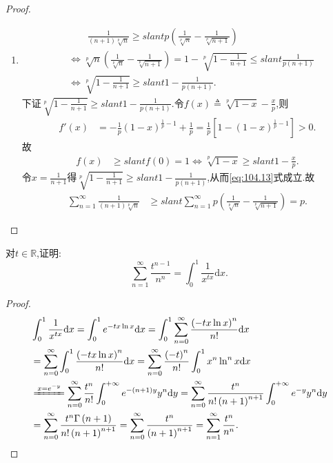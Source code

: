 \documentclass[../../main.tex]{subfiles}
\begin{document}
\begin{proof}
\begin{enumerate}
\item \begin{align}
&\quad \quad \frac{1}{\left( n+1 \right) \sqrt[p]{n}}\geqslant slant p\left( \frac{1}{\sqrt[p]{n}}-\frac{1}{\sqrt[p]{n+1}} \right) \label{eq:104.13} \\
&\Longleftrightarrow \sqrt[p]{n}\left( \frac{1}{\sqrt[p]{n}}-\frac{1}{\sqrt[p]{n+1}} \right) =1-\sqrt[p]{1-\frac{1}{n+1}}\leqslant slant \frac{1}{p\left( n+1 \right)}\nonumber \\
&\Longleftrightarrow \sqrt[p]{1-\frac{1}{n+1}}\geqslant slant 1-\frac{1}{p\left( n+1 \right)}.\nonumber
\end{align}
下证$\sqrt[p]{1-\frac{1}{n+1}}\geqslant slant 1-\frac{1}{p\left( n+1 \right)}$.令$f\left( x \right) \triangleq \sqrt[p]{1-x}-\frac{x}{p}$,则
\begin{align*}
f\prime \left( x \right) &=-\frac{1}{p}\left( 1-x \right) ^{\frac{1}{p}-1}+\frac{1}{p}=\frac{1}{p}\left[ 1-\left( 1-x \right) ^{\frac{1}{p}-1} \right] >0.
\end{align*}
故
\begin{align*}
f\left( x \right) &\geqslant slant f\left( 0 \right) =1\Longleftrightarrow \sqrt[p]{1-x}\geqslant slant 1-\frac{x}{p}.
\end{align*}
令$x=\frac{1}{n+1}$得$\sqrt[p]{1-\frac{1}{n+1}}\geqslant slant 1-\frac{1}{p\left( n+1 \right)}$,从而\eqref{eq:104.13}式成立.故
\begin{align*}
\sum_{n=1}^{\infty}{\frac{1}{\left( n+1 \right) \sqrt[p]{n}}}&\geqslant slant \sum_{n=1}^{\infty}{p\left( \frac{1}{\sqrt[p]{n}}-\frac{1}{\sqrt[p]{n+1}} \right)}=p.
\end{align*}
\end{enumerate}
\end{proof}

\begin{example}
对$t \in \mathbb{R}$,证明:
$$\sum_{n=1}^\infty \frac{t^{n-1}}{n^n}=\int_0^1 \frac{1}{x^{tx}}\mathrm{d}x.$$
\end{example}
\begin{proof}
\begin{align*}
&\int_0^1{\frac{1}{x^{tx}}\mathrm{d}x}=\int_0^1{e^{-tx\ln x}\mathrm{d}x}=\int_0^1{\sum_{n=0}^{\infty}{\frac{\left( -tx\ln x \right) ^n}{n!}\mathrm{d}x}}
\\
&=\sum_{n=0}^{\infty}{\int_0^1{\frac{\left( -tx\ln x \right) ^n}{n!}\mathrm{d}x}}=\sum_{n=0}^{\infty}{\frac{\left( -t \right) ^n}{n!}\int_0^1{x^n\ln ^nx\mathrm{d}x}}
\\
&\xlongequal{x=e^{-y}}\sum_{n=0}^{\infty}{\frac{t^n}{n!}\int_0^{+\infty}{e^{-\left( n+1 \right) y}y^n\mathrm{d}y}}=\sum_{n=0}^{\infty}{\frac{t^n}{n!\left( n+1 \right) ^{n+1}}\int_0^{+\infty}{e^{-y}y^n\mathrm{d}y}}
\\
&=\sum_{n=0}^{\infty}{\frac{t^n\Gamma \left( n+1 \right)}{n!\left( n+1 \right) ^{n+1}}}=\sum_{n=0}^{\infty}{\frac{t^n}{\left( n+1 \right) ^{n+1}}}=\sum_{n=1}^{\infty}{\frac{t^n}{n^n}}.
\end{align*}
\end{proof}
\end{document}
